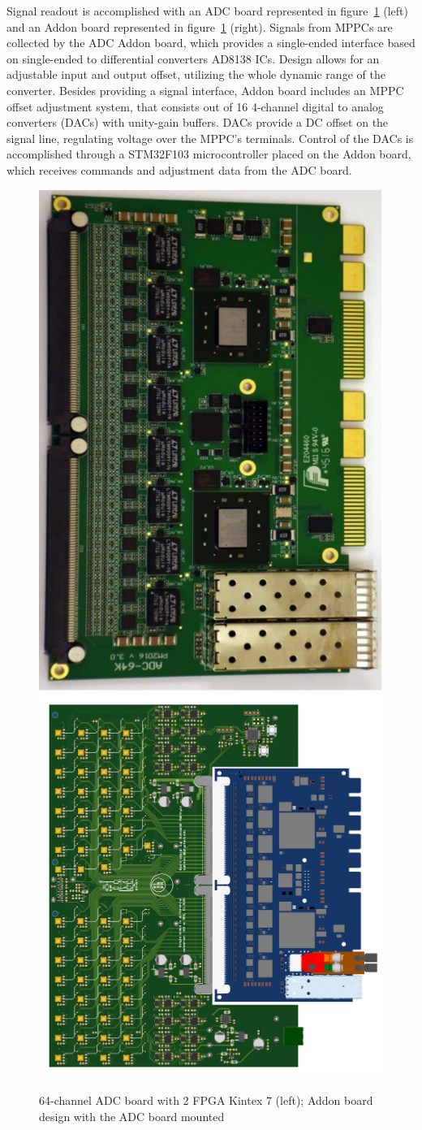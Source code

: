 \documentclass[a4paper,11pt]{article}
\begin{document}
Signal readout is accomplished with an ADC board represented in figure~\ref{fig:3} (left) and an Addon board represented in figure~\ref{fig:3} (right). Signals from MPPCs are collected by the ADC Addon board, which provides a single-ended interface based on single-ended to differential converters AD8138 ICs. Design allows for an adjustable input and output offset, utilizing the whole dynamic range of the converter. Besides providing a signal interface, Addon board includes an MPPC offset adjustment system, that consists out of 16 4-channel digital to analog converters (DACs) with unity-gain buffers. DACs provide a DC offset on the signal line, regulating voltage over the MPPC's terminals. Control of the DACs is accomplished through a STM32F103 microcontroller placed on the Addon board, which receives commands and adjustment data from the ADC board.

\begin{figure}[htbp]
	\centering
	\includegraphics[width=.3\textwidth]{ADC_board.png}
	\quad
\includegraphics[width=.4\textwidth]{ADC_addon.png}
	\caption{\label{fig:3} 64-channel ADC board with 2 FPGA Kintex 7 (left); Addon board design with the ADC board mounted}
\end{figure}
\end{document}
